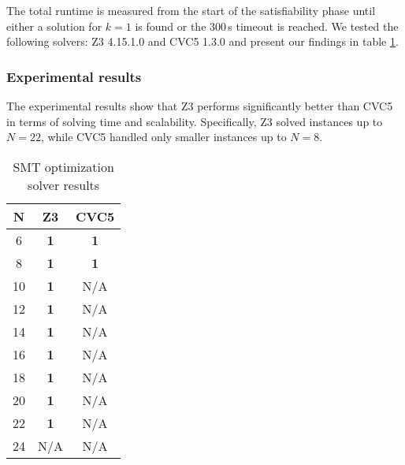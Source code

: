 The total runtime is measured from the start of the satisfiability phase until either a solution for \(k = 1\) is found or the 300\,s timeout is reached.
We tested the following solvers: Z3 4.15.1.0 and CVC5 1.3.0 and present our findings in table \ref{table:smt-result}. 

\subsubsection{Experimental results}

The experimental results show that Z3 performs significantly better than CVC5 in terms of solving time and scalability. Specifically, Z3 solved instances up to $N=22$, while CVC5 handled only smaller instances up to $N=8$.

\begin{table}[H]
\centering
\small
\begin{tabular}{|c|c|c|}
\toprule
\textbf{N} & \textbf{Z3} & \textbf{CVC5} \\
\midrule
6  & \textbf{1}   & \textbf{1}   \\
8  & \textbf{1}   & \textbf{1}   \\
10 & \textbf{1}   & N/A \\
12 & \textbf{1}   & N/A \\
14 & \textbf{1}   & N/A \\
16 & \textbf{1}   & N/A \\
18 & \textbf{1}   & N/A \\
20 & \textbf{1}  & N/A \\
22 & \textbf{1} & N/A \\
24 & N/A & N/A \\
\bottomrule
\end{tabular}
\caption{SMT optimization solver results}
\label{table:smt-result}
\end{table}

